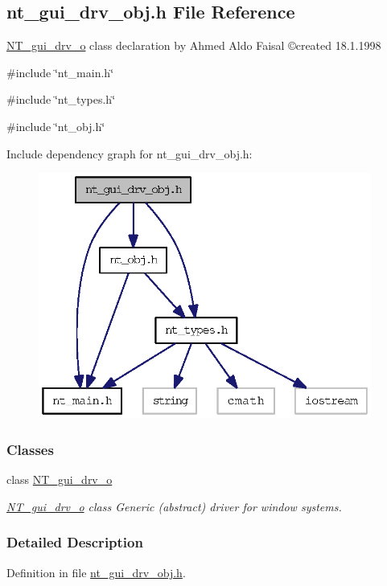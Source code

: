 \subsection{nt\_\-gui\_\-drv\_\-obj.h File Reference}
\label{nt__gui__drv__obj_8h}



\begin{DoxyItemize}
\item \hyperlink{class_n_t__gui__drv__o}{NT\_\-gui\_\-drv\_\-o} class declaration by Ahmed Aldo Faisal \copyright created 18.1.1998 
\end{DoxyItemize} 


{\ttfamily \#include \char`\"{}nt\_\-main.h\char`\"{}}\par
{\ttfamily \#include \char`\"{}nt\_\-types.h\char`\"{}}\par
{\ttfamily \#include \char`\"{}nt\_\-obj.h\char`\"{}}\par
Include dependency graph for nt\_\-gui\_\-drv\_\-obj.h:
\nopagebreak
\begin{figure}[H]
\begin{center}
\leavevmode
\includegraphics[width=310pt]{nt__gui__drv__obj_8h__incl}
\end{center}
\end{figure}
\subsubsection*{Classes}
\begin{DoxyCompactItemize}
\item 
class \hyperlink{class_n_t__gui__drv__o}{NT\_\-gui\_\-drv\_\-o}
\begin{DoxyCompactList}\small\item\em \hyperlink{class_n_t__gui__drv__o}{NT\_\-gui\_\-drv\_\-o} class Generic (abstract) driver for window systems. \item\end{DoxyCompactList}\end{DoxyCompactItemize}


\subsubsection{Detailed Description}


Definition in file \hyperlink{nt__gui__drv__obj_8h_source}{nt\_\-gui\_\-drv\_\-obj.h}.

